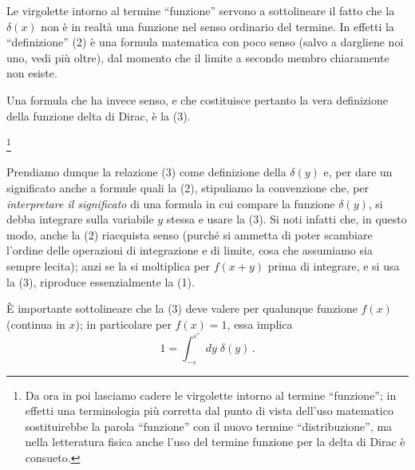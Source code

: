 \documentclass[11pt, a4paper]{book}
\numberwithin{equation}{section}
\begin{document}
Le virgolette intorno al termine ``funzione'' servono a sottolineare il fatto che la $\delta(x)$ non è in realtà una funzione nel senso ordinario del termine. In effetti la ``definizione'' (2) è una formula matematica con poco senso (salvo a dargliene noi uno, vedi più oltre), dal momento che il limite a secondo membro chiaramente non esiste.

Una formula che ha invece senso, e che costituisce pertanto la vera definizione della funzione delta di Dirac, è la (3).

\footnote{Da ora in poi lasciamo cadere le virgolette intorno al termine ``funzione''; in effetti una terminologia più corretta dal punto di vista dell'uso matematico sostituirebbe la parola ``funzione'' con il nuovo termine ``distribuzione'', ma nella letteratura fisica anche l'uso del termine funzione per la delta di Dirac è consueto.}

Prendiamo dunque la relazione (3) come definizione della $\delta(y)$ e, per dare un significato anche a formule quali la (2), stipuliamo la convenzione che, per \textit{interpretare il significato} di una formula in cui compare la funzione $\delta(y)$, si debba integrare sulla variabile $y$ stessa e usare la (3). Si noti infatti che, in questo modo, anche la (2) riacquista senso (purché si ammetta di poter scambiare l'ordine delle operazioni di integrazione e di limite, cosa che assumiamo sia sempre lecita); anzi se la si moltiplica per $f(x+y)$ prima di integrare, e si usa la (3), riproduce essenzialmente la (1).

È importante sottolineare che la (3) deve valere per qualunque funzione $f(x)$ (continua in $x$); in particolare per $f(x)=1$, essa implica
\begin{equation}
  1 = \int_{-\varepsilon}^{\varepsilon'} dy\;\delta(y)\,. \tag{4}
\end{equation}
\end{document}
